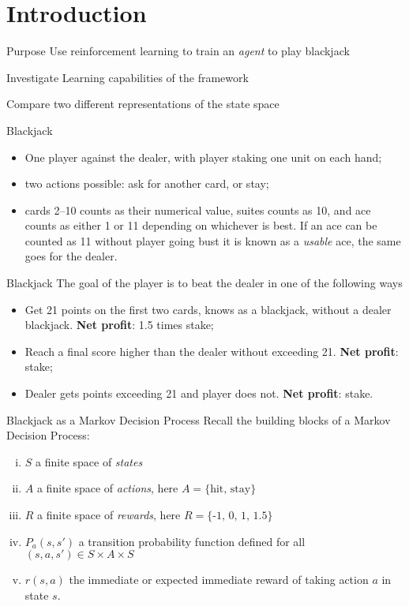 

\section{Introduction}

\begin{frame}{Purpose}
	Use reinforcement learning to train an \textit{agent} to play blackjack\newline
	
	Investigate Learning capabilities of the framework\newline
		
	Compare two different representations of the state space
\end{frame}

\begin{frame}{Blackjack}
\begin{itemize}
	\item One player against the dealer, with player staking one unit on each hand;
	\item two actions possible: ask for another card, or stay;
	\item cards 2--10 counts as their numerical value, suites counts as 10, and ace counts as either 1 or 11 depending on whichever is best. If an ace can be counted as 11 without player going bust it is known as a \textit{usable} ace, the same goes for the dealer.
\end{itemize}
\end{frame}

\begin{frame}{Blackjack}
	The goal of the player is to beat the dealer in one of the following ways
	\begin{itemize}
		\item Get 21 points on the first two cards, knows as a blackjack, without a dealer blackjack. \textbf{Net profit}: 1.5 times stake;
		\item Reach a final score higher than the dealer without exceeding 21. \textbf{Net profit}: stake;
		\item Dealer gets points exceeding 21 and player does not. \textbf{Net profit}: stake.
	\end{itemize}
\end{frame}

\begin{frame}{Blackjack as a Markov Decision Process}
	Recall the building blocks of a Markov Decision Process:
	\begin{enumerate}[(i)]
		\item  $S$ a finite space of \textit{states}
		\item  $A$ a finite space of \textit{actions}, here $A = \{\text{hit, stay}\}$
		\item  $R$ a finite space of \textit{rewards}, here $R = \{\text{-1, 0, 1, 1.5} \}$
		\item  $P_a(s,s')$ a transition probability function defined for all  $(s,a,s') \in S\times A \times S$
		\item  $r(s,a)$ the immediate or expected immediate reward of taking action $a$ in state $s$.
	\end{enumerate}
\end{frame}

